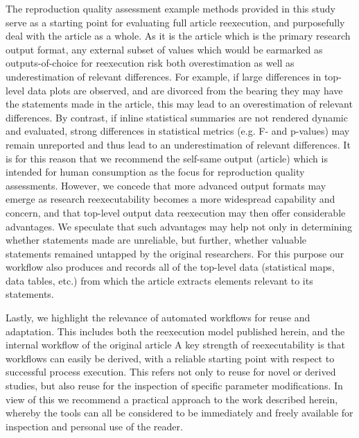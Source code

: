 The reproduction quality assessment example methods provided in this study serve as a starting point for evaluating full article reexecution, and purposefully deal with the article as a whole.
As it is the article which is the primary research output format, any external subset of values which would be earmarked as outputs-of-choice for reexecution risk both overestimation as well as underestimation of relevant differences.
For example, if large differences in top-level data plots are observed, and are divorced from the bearing they may have the statements made in the article, this may lead to an overestimation of relevant differences.
By contrast, if inline statistical summaries are not rendered dynamic and evaluated, strong differences in statistical metrics (e.g. F- and p-values) may remain unreported and thus lead to an underestimation of relevant differences.
It is for this reason that we recommend the self-same output (article) which is intended for human consumption as the focus for reproduction quality assessments.
However, we concede that more advanced output formats may emerge as research reexecutability becomes a more widespread capability and concern, and that top-level output data reexecution may then offer considerable advantages.
We speculate that such advantages may help not only in determining whether statements made are unreliable, but further, whether valuable statements remained untapped by the original researchers.
For this purpose our workflow also produces and records all of the top-level data (statistical maps, data tables, etc.) from which the article extracts elements relevant to its statements.

Lastly, we highlight the relevance of automated workflows for reuse and adaptation.
This includes both the reexecution model published herein, and the internal workflow of the original article
A key strength of reexecutability is that workflows can easily be derived, with a reliable starting point with respect to successful process execution.
This refers not only to reuse for novel or derived studies, but also reuse for the inspection of specific parameter modifications.
In view of this we recommend a practical approach to the work described herein, whereby the tools can all be considered to be immediately and freely available for inspection and personal use of the reader.






